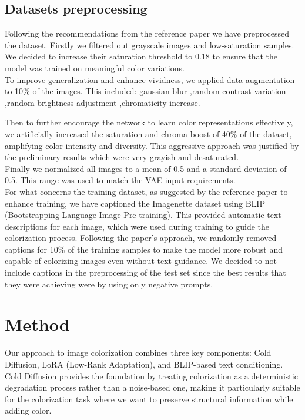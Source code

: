 \documentclass[10pt,twocolumn,letterpaper]{article}
\begin{document}
\subsection{Datasets preprocessing}
Following the recommendations from the reference paper we have preprocessed the dataset. Firstly we filtered out grayscale images and low-saturation samples. We decided to increase their saturation threshold to 0.18 to ensure that the model was trained on meaningful color variations. 
\\
\indent
To improve generalization and enhance vividness, we applied data augmentation to 10\% of the images. This included:
gaussian blur
,random contrast variation 
,random brightness adjustment 
,chromaticity increase.

Then to further encourage the network to learn color representations effectively, we artificially increased the saturation and chroma boost of 40\% of the dataset, amplifying color intensity and diversity. This aggressive approach was justified by the preliminary results which were very grayish and desaturated.
\\
\indent
Finally we normalized all images to a mean of 0.5 and a standard deviation of 0.5. This range was used to match the VAE input requirements.
\\
\indent
For what concerns the training dataset, as suggested by the reference paper to enhance training, we have captioned the Imagenette dataset using BLIP (Bootstrapping Language-Image Pre-training). This provided automatic text descriptions for each image, which were used during training to guide the colorization process. Following the paper's approach, we randomly removed captions for 10\% of the training samples to make the model more robust and capable of colorizing images even without text guidance. We decided to not include captions in the preprocessing of the test set since the best results that they were achieving were by using only negative prompts.

\section{Method}
Our approach to image colorization combines three key components: Cold Diffusion, LoRA (Low-Rank Adaptation), and BLIP-based text conditioning. Cold Diffusion provides the foundation by treating colorization as a deterministic degradation process rather than a noise-based one, making it particularly suitable for the colorization task where we want to preserve structural information while adding color.
\end{document}
